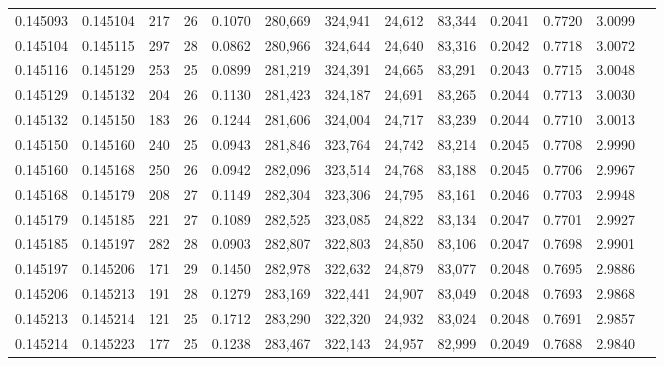 \begin{tabular}{rrrrrrrrrrrrr}
0.145093 & 0.145104 & 217 &  26 &                                     0.1070 & 280,669 & 324,941 &  24,612 &  83,344 & 0.2041 & 0.7720 & 3.0099 \\
0.145104 & 0.145115 & 297 &  28 &                                     0.0862 & 280,966 & 324,644 &  24,640 &  83,316 & 0.2042 & 0.7718 & 3.0072 \\
0.145116 & 0.145129 & 253 &  25 &                                     0.0899 & 281,219 & 324,391 &  24,665 &  83,291 & 0.2043 & 0.7715 & 3.0048 \\
0.145129 & 0.145132 & 204 &  26 &                                     0.1130 & 281,423 & 324,187 &  24,691 &  83,265 & 0.2044 & 0.7713 & 3.0030 \\
0.145132 & 0.145150 & 183 &  26 &                                     0.1244 & 281,606 & 324,004 &  24,717 &  83,239 & 0.2044 & 0.7710 & 3.0013 \\
0.145150 & 0.145160 & 240 &  25 &                                     0.0943 & 281,846 & 323,764 &  24,742 &  83,214 & 0.2045 & 0.7708 & 2.9990 \\
0.145160 & 0.145168 & 250 &  26 &                                     0.0942 & 282,096 & 323,514 &  24,768 &  83,188 & 0.2045 & 0.7706 & 2.9967 \\
0.145168 & 0.145179 & 208 &  27 &                                     0.1149 & 282,304 & 323,306 &  24,795 &  83,161 & 0.2046 & 0.7703 & 2.9948 \\
0.145179 & 0.145185 & 221 &  27 &                                     0.1089 & 282,525 & 323,085 &  24,822 &  83,134 & 0.2047 & 0.7701 & 2.9927 \\
0.145185 & 0.145197 & 282 &  28 &                                     0.0903 & 282,807 & 322,803 &  24,850 &  83,106 & 0.2047 & 0.7698 & 2.9901 \\
0.145197 & 0.145206 & 171 &  29 &                                     0.1450 & 282,978 & 322,632 &  24,879 &  83,077 & 0.2048 & 0.7695 & 2.9886 \\
0.145206 & 0.145213 & 191 &  28 &                                     0.1279 & 283,169 & 322,441 &  24,907 &  83,049 & 0.2048 & 0.7693 & 2.9868 \\
0.145213 & 0.145214 & 121 &  25 &                                     0.1712 & 283,290 & 322,320 &  24,932 &  83,024 & 0.2048 & 0.7691 & 2.9857 \\
0.145214 & 0.145223 & 177 &  25 &                                     0.1238 & 283,467 & 322,143 &  24,957 &  82,999 & 0.2049 & 0.7688 & 2.9840 \\

\end{tabular}

